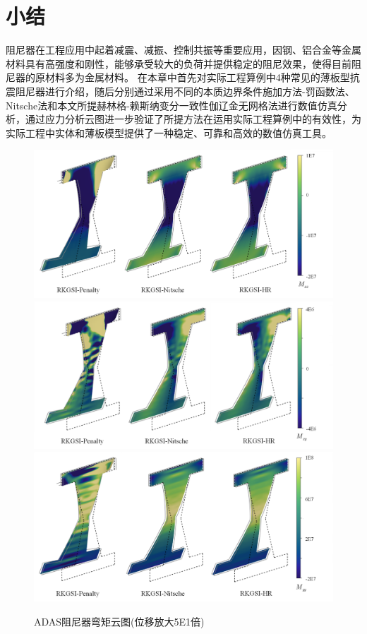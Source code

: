 \section{小结}
阻尼器在工程应用中起着减震、减振、控制共振等重要应用，因钢、铝合金等金属材料具有高强度和刚性，能够承受较大的负荷并提供稳定的阻尼效果，使得目前阻尼器的原材料多为金属材料。
在本章中首先对实际工程算例中4种常见的薄板型抗震阻尼器进行介绍，随后分别通过采用不同的本质边界条件施加方法-罚函数法、Nitsche法和本文所提赫林格-赖斯纳变分一致性伽辽金无网格法进行数值仿真分析，通过应力分析云图进一步验证了所提方法在运用实际工程算例中的有效性，为实际工程中实体和薄板模型提供了一种稳定、可靠和高效的数值仿真工具。
\begin{figure}[H]
    \centering
        \includegraphics[scale=0.4]{figure/DAMPER/ADAS/M11.png}
        \includegraphics[scale=0.4]{figure/DAMPER/ADAS/M12.png}
        \includegraphics[scale=0.4]{figure/DAMPER/ADAS/M22.png}
    \caption{ADAS阻尼器弯矩云图(位移放大5E1倍)}\label{ADASM}
\end{figure}
